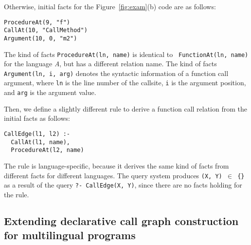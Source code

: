 Otherwise, initial facts for the Figure~\ref{fig:exam}(b) code are as follows: 

\begin{lstlisting}
ProcedureAt(9, "f")
CallAt(10, "CallMethod")
Argument(10, 0, "m2")
\end{lstlisting}

\noindent
The kind of facts {\tt ProcedureAt(ln, name)} is identical to {\tt
FunctionAt(ln, name)} for the language {\it A}, but has a different relation
name. The kind of facts {\tt Argument(ln, i, arg)} denotes the syntactic
information of a function call argument, where {\tt ln} is the line number of
the callsite, {\tt i} is the argument position, and {\tt arg} is the argument
value.

Then, we define a slightly different rule to derive a function call relation
from the initial facts as follows: 

\begin{lstlisting}
CallEdge(l1, l2) :-
  CallAt(l1, name),
  ProcedureAt(l2, name)
\end{lstlisting}

\noindent
The rule is language-specific, because it derives the same kind of facts from
different facts for different languages.  The query system produces {\tt (X, Y)
$\in$ \{\}} as a result of the query {\tt ?- CallEdge(X, Y)}, since there are
no facts holding for the rule.

%


\subsection{Extending declarative call graph construction for multilingual programs}

